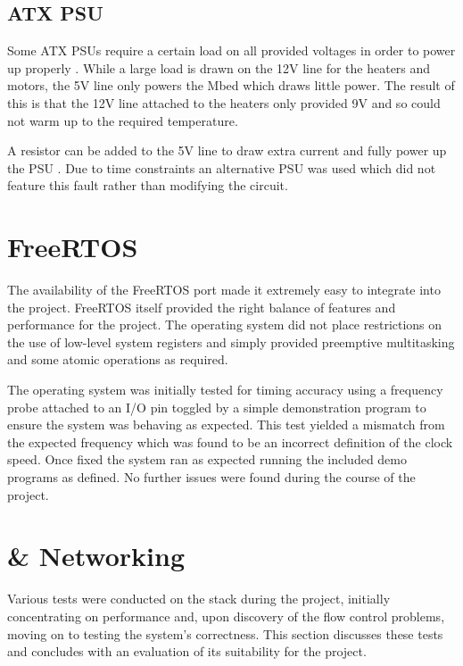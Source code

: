 		\subsection{ATX PSU}
			
			Some ATX PSUs require a certain load on all provided voltages in order to
			power up properly \cite{reprapatx}. While a large load is drawn on the 12V
			line for the heaters and motors, the 5V line only powers the Mbed which
			draws little power. The result of this is that the 12V line attached to
			the heaters only provided 9V and so could not warm up to the required
			temperature.
			
			A resistor can be added to the 5V line to draw extra current and fully
			power up the PSU \cite{reprapatx}. Due to time constraints an alternative
			PSU was used which did not feature this fault rather than modifying the
			circuit.
	
	\section{FreeRTOS}
		
		The availability of the FreeRTOS port made it extremely easy to integrate
		into the project. FreeRTOS itself provided the right balance of features and
		performance for the project. The operating system did not place restrictions
		on the use of low-level system registers and simply provided preemptive
		multitasking and some atomic operations as required.
		
		The operating system was initially tested for timing accuracy using a
		frequency probe attached to an I/O pin toggled by a simple demonstration
		program to ensure the system was behaving as expected. This test yielded a
		mismatch from the expected frequency which was found to be an incorrect
		definition of the clock speed. Once fixed the system ran as expected running
		the included demo programs as defined. No further issues were found during
		the course of the project.
	
	\section{\uIP{} \& Networking}
		
		
		Various tests were conducted on the \uIP{} stack during the project,
		initially concentrating on performance and, upon discovery of the flow
		control problems, moving on to testing the system's correctness. This
		section discusses these tests and concludes with an evaluation of its
		suitability for the project.
		
